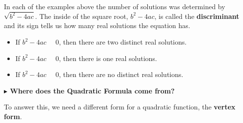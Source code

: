 \documentclass{ximera}
\begin{document}
In each of the examples above the number of solutions was determined by $\sqrt{b^2 - 4 a c}$.  The inside of the square root, $b^2 - 4 a c$, is called the \textbf{discriminant} and its sign tells us how many real solutions the equation has.


\begin{itemize}
\item If $b^2 - 4 a c$ \, \wordChoice{\choice[correct]{$>$}\choice{$=$}\choice{$<$}} \, $0$, then there are two distinct real solutions.
\item If $b^2 - 4 a c$ \, \wordChoice{\choice{$>$}\choice[correct]{$=$}\choice{$<$}} \, $0$, then there is one real solutions.
\item If $b^2 - 4 a c$ \, \wordChoice{\choice{$>$}\choice{$=$}\choice[correct]{$<$}} \, $0$, then there are no distinct real solutions.

\end{itemize}








\textbf{\textcolor{purple!85!blue}{$\blacktriangleright$ Where does the Quadratic Formula come from?}} 

To answer this, we need a different form for a quadratic function, the \textbf{vertex form}.
\end{document}
